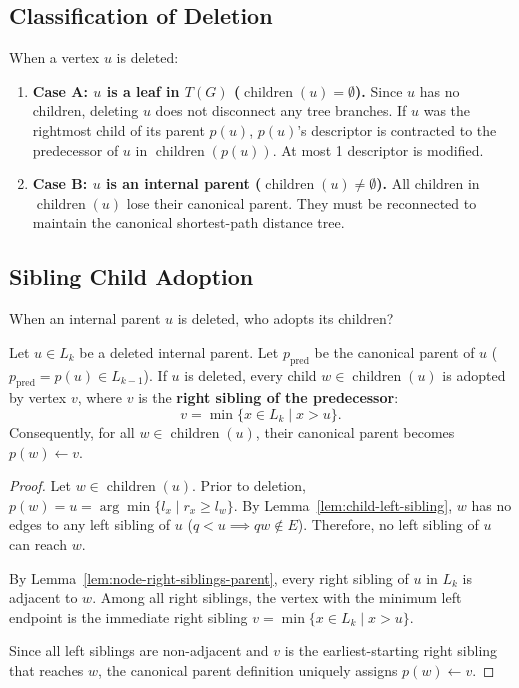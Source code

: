 \subsection{Classification of Deletion}
When a vertex $u$ is deleted:
\begin{enumerate}
    \item \textbf{Case A: $u$ is a leaf in $T(G)$ ($\operatorname{children}(u) = \emptyset$).}
    Since $u$ has no children, deleting $u$ does not disconnect any tree branches. If $u$ was the rightmost child of its parent $p(u)$, $p(u)$'s descriptor is contracted to the predecessor of $u$ in $\operatorname{children}(p(u))$. At most 1 descriptor is modified.
    
    \item \textbf{Case B: $u$ is an internal parent ($\operatorname{children}(u) \ne \emptyset$).}
    All children in $\operatorname{children}(u)$ lose their canonical parent. They must be reconnected to maintain the canonical shortest-path distance tree.
\end{enumerate}

\subsection{Sibling Child Adoption}

When an internal parent $u$ is deleted, who adopts its children?

\begin{lemma}
\label{lem:adopting_sibling}
Let $u \in L_k$ be a deleted internal parent. Let $p_{\text{pred}}$ be the canonical parent of $u$ ($p_{\text{pred}} = p(u) \in L_{k-1}$). If $u$ is deleted, every child $w \in \operatorname{children}(u)$ is adopted by vertex $v$, where $v$ is the \textbf{right sibling of the predecessor}:
\begin{equation}
    v = \min \{ x \in L_k \mid x > u \}.
\end{equation}
Consequently, for all $w \in \operatorname{children}(u)$, their canonical parent becomes $p(w) \leftarrow v$.
\end{lemma}
\begin{proof}
Let $w \in \operatorname{children}(u)$. Prior to deletion, $p(w) = u = \arg\min \{l_x \mid r_x \ge l_w\}$. By Lemma~\ref{lem:child-left-sibling}, $w$ has no edges to any left sibling of $u$ ($q < u \implies qw \notin E$). Therefore, no left sibling of $u$ can reach $w$. 

By Lemma~\ref{lem:node-right-siblings-parent}, every right sibling of $u$ in $L_k$ is adjacent to $w$. Among all right siblings, the vertex with the minimum left endpoint is the immediate right sibling $v = \min \{x \in L_k \mid x > u\}$. 

Since all left siblings are non-adjacent and $v$ is the earliest-starting right sibling that reaches $w$, the canonical parent definition uniquely assigns $p(w) \leftarrow v$.
\end{proof}

